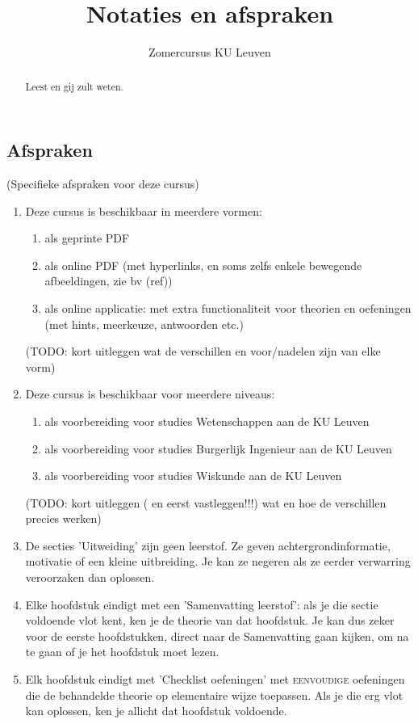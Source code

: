 \documentclass{ximera}
\author{Zomercursus KU Leuven}
\title[Inleiding:]{Notaties en afspraken}
\begin{document}
\begin{abstract}
	Leest en gij zult weten.
\end{abstract}
\maketitle


\subsection{Afspraken }

\begin{remark} (Specifieke afspraken voor deze cursus)
	
	\begin{enumerate}
		\item Deze cursus is beschikbaar in meerdere vormen:
		\begin{enumerate}
			\item als geprinte PDF
			\item als online PDF (met hyperlinks, en soms zelfs enkele bewegende afbeeldingen, zie bv (ref))
			\item als online applicatie: met extra functionaliteit voor theorien en oefeningen (met hints, meerkeuze, antwoorden etc.)
		\end{enumerate} 
		(TODO: kort uitleggen wat de verschillen en voor/nadelen zijn van elke vorm)
		\item Deze cursus is beschikbaar voor meerdere niveaus:
		\begin{enumerate}
			\item als voorbereiding voor studies Wetenschappen aan de KU Leuven
			\item als voorbereiding voor studies Burgerlijk Ingenieur aan de KU Leuven
			\item als voorbereiding voor studies Wiskunde aan de KU Leuven
		\end{enumerate}
		(TODO: kort uitleggen ( en eerst vastleggen!!!)  wat en hoe de verschillen precies werken)
		\item De secties 'Uitweiding' zijn geen leerstof. Ze geven achtergrondinformatie, motivatie of een kleine uitbreiding. Je kan ze negeren als ze eerder verwarring veroorzaken dan oplossen.
		\item Elke hoofdstuk eindigt met een 'Samenvatting leerstof': als je die sectie voldoende vlot kent, ken je de theorie van dat hoofdstuk. Je kan dus zeker voor de eerste hoofdstukken, direct naar de Samenvatting gaan kijken, om na te gaan of je het hoofdstuk moet lezen.
		\item Elk hoofdstuk eindigt met 'Checklist oefeningen' met \textsc{eenvoudige} oefeningen die de behandelde theorie op elementaire wijze toepassen. Als je die erg vlot kan oplossen, ken je allicht dat hoofdstuk voldoende. 
		

\end{enumerate}
\end{remark}
\end{document}
